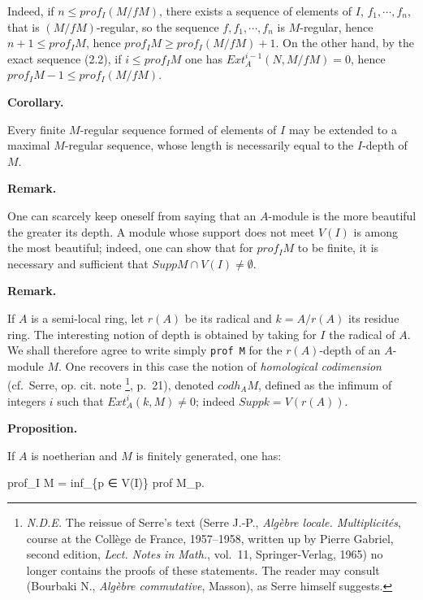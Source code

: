 \documentclass[
]{article}
\newenvironment{Shaded}{}{}
\newcommand{\NormalTok}[1]{#1}
\begin{document}
Indeed, if \(n \leqslant prof_{I}(M/f M)\), there exists a sequence of
elements of \(I\), \(f_{1}, \cdots, f_{n}\), that is
\((M/f M)\)-regular, so the sequence \(f, f_{1}, \cdots, f_{n}\) is
\(M\)-regular, hence \(n + 1 \leqslant prof_{I} M\), hence
\(prof_{I} M \geqslant prof_{I}(M/f M) + 1\). On the other hand, by the
exact sequence (2.2), if \(i \leqslant prof_{I} M\) one has
\(Ext^{i-1}_{A}(N, M/f M) = 0\), hence
\(prof_{I} M - 1 \leqslant prof_{I}(M/f M)\).

\textbf{Corollary.}

Every finite \(M\)-regular sequence formed of elements of \(I\) may be
extended to a maximal \(M\)-regular sequence, whose length is
necessarily equal to the \(I\)-depth of \(M\).

\textbf{Remark.}

One can scarcely keep oneself from saying that an \(A\)-module is the
more beautiful the greater its depth. A module whose support does not
meet \(V(I)\) is among the most beautiful; indeed, one can show that for
\(prof_{I} M\) to be finite, it is necessary and sufficient that
\(Supp M \cap V(I) \neq \emptyset\).

\textbf{Remark.}

If \(A\) is a semi-local ring, let \(r(A)\) be its radical and
\(k = A/r(A)\) its residue ring. The interesting notion of depth is
obtained by taking for \(I\) the radical of \(A\). We shall therefore
agree to write simply \texttt{prof\ M} for the \(r(A)\)-depth of an
\(A\)-module \(M\). One recovers in this case the notion of
\emph{homological codimension} (cf.~Serre, op. cit. note \footnote{\emph{N.D.E.}
  The reissue of Serre's text (Serre J.-P., \emph{Algèbre locale.
  Multiplicités}, course at the Collège de France, 1957--1958, written
  up by Pierre Gabriel, second edition, \emph{Lect. Notes in Math.},
  vol.~11, Springer-Verlag, 1965) no longer contains the proofs of these
  statements. The reader may consult (Bourbaki N., \emph{Algèbre
  commutative}, Masson), as Serre himself suggests.}, p.~21), denoted
\(codh_{A} M\), defined as the infimum of integers \(i\) such that
\(Ext^{i}_{A}(k, M) \neq 0\); indeed \(Supp k = V(r(A))\).

\textbf{Proposition.}

If \(A\) is noetherian and \(M\) is finitely generated, one has:

\begin{Shaded}
\begin{Highlighting}[]
\NormalTok{prof\_I M = inf\_\{p ∈ V(I)\} prof M\_p.}
\end{Highlighting}
\end{Shaded}
\end{document}
